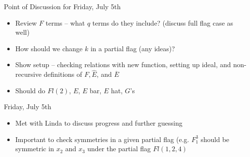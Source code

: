 Point of Discussion for Friday, July 5th
\begin{itemize}
    \item Review $F$ terms -- what $q$ terms do they include? (discuss full flag case as well)
    \item How should we change $k$ in a partial flag (any ideas)?
    \item Show setup -- checking relations with new function, setting up ideal, and non-recursive definitions of $F, \hat{E}$, and $\overline{E}$
    \item Should do $Fl(2)$, $E$, $E$ bar, $E$ hat, $G$'s
\end{itemize}

Friday, July 5th
\begin{itemize}
    \item Met with Linda to discuss progress and further guessing
    \item Important to check symmetries in a given partial flag (e.g. $F_1^3$ should be symmetric in $x_2$ and $x_3$ under the partial flag $Fl(1, 2, 4)$
\end{itemize}